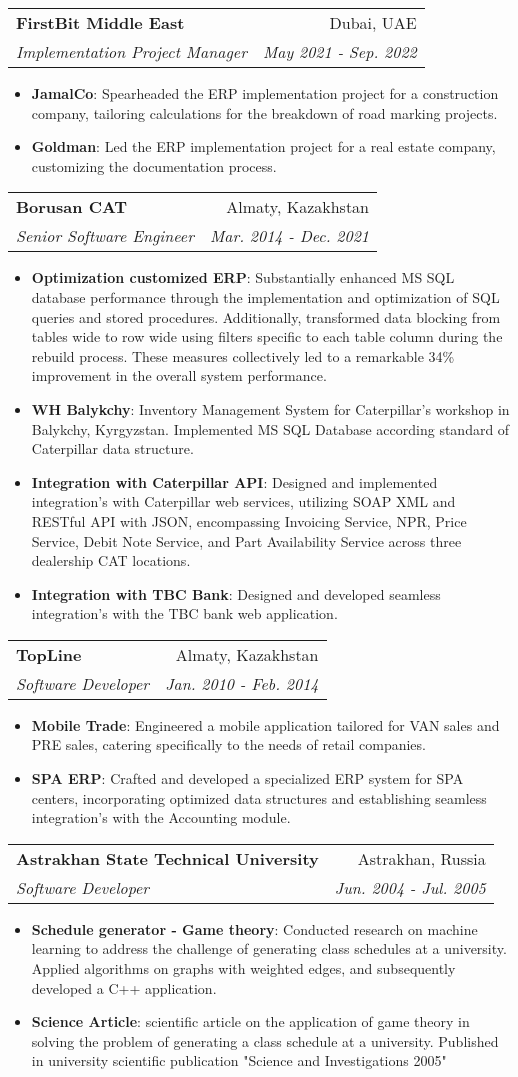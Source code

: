 \documentclass[letterpaper,11pt]{article}
\makeatletter
\newcommand{\resumeItem}[2]{
  \item\small{
    \textbf{#1}{: #2 \vspace{-2pt}}
  }
}
\newcommand{\resumeSubheading}[4]{
  \vspace{-1pt}\item
    \begin{tabular*}{0.97\textwidth}[t]{l@{\extracolsep{\fill}}r}
      \textbf{#1} & #2 \\
      \textit{\small#3} & \textit{\small #4} \\
    \end{tabular*}\vspace{-5pt}
}
\newcommand{\resumeItemListStart}{\begin{itemize}}
\newcommand{\resumeItemListEnd}{\end{itemize}\vspace{-5pt}}
\makeatother
\begin{document}
    \resumeSubheading{FirstBit Middle East}{Dubai, UAE}{Implementation Project Manager}{May 2021 - Sep. 2022}\resumeItemListStart\resumeItem{JamalCo}{Spearheaded the ERP implementation project for a construction company, tailoring calculations for the breakdown of road marking projects.}\resumeItem{Goldman}{Led the ERP implementation project for a real estate company, customizing the documentation process.}\resumeItemListEnd
    
    \resumeSubheading{Borusan CAT}{Almaty, Kazakhstan}{Senior Software Engineer}{Mar. 2014 - Dec. 2021}
    \resumeItemListStart
    
        \resumeItem{Optimization customized ERP}{Substantially enhanced MS SQL database performance through the implementation and optimization of SQL queries and stored procedures. Additionally, transformed data blocking from tables wide to row wide using filters specific to each table column during the rebuild process. These measures collectively led to a remarkable 34\% improvement in the overall system performance.}
        \resumeItem{WH Balykchy}{Inventory Management System for Caterpillar's workshop in Balykchy, Kyrgyzstan. Implemented MS SQL Database according standard of Caterpillar data structure. }
        \resumeItem{Integration with Caterpillar API}{Designed and implemented integration's with Caterpillar web services, utilizing SOAP XML and RESTful API with JSON, encompassing Invoicing Service, NPR, Price Service, Debit Note Service, and Part Availability Service across three dealership CAT locations.}
        \resumeItem{Integration with TBC Bank}{Designed and developed seamless integration's with the TBC bank web application.}
    \resumeItemListEnd

    \resumeSubheading{TopLine}{Almaty, Kazakhstan}{Software Developer}{Jan. 2010 - Feb. 2014}\resumeItemListStart\resumeItem{Mobile Trade}{Engineered a mobile application tailored for VAN sales and PRE sales, catering specifically to the needs of retail companies.}\resumeItem{SPA ERP}{Crafted and developed a specialized ERP system for SPA centers, incorporating optimized data structures and establishing seamless integration's with the Accounting module.}\resumeItemListEnd
      
    \resumeSubheading{Astrakhan State Technical University}{Astrakhan, Russia}{Software Developer}{Jun. 2004 - Jul. 2005}\resumeItemListStart\resumeItem{Schedule generator - Game theory}{Conducted research on machine learning to address the challenge of generating class schedules at a university. Applied algorithms on graphs with weighted edges, and subsequently developed a C++ application.}\resumeItem{Science Article}{scientific article on the application of game theory in solving the problem of generating a class schedule at a university. Published in university scientific publication "Science and Investigations 2005"}\resumeItemListEnd
\end{document}
